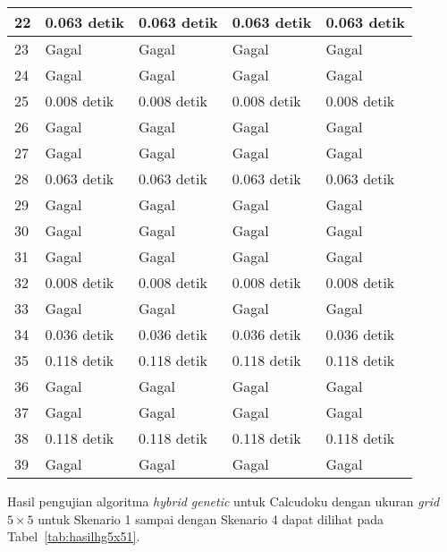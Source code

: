 \begin{table}
\begin{tabular}{| l | l | l | l | l |}
\hline
22 & 0.063 detik & 0.063 detik & 0.063 detik & 0.063 detik \\
\hline
23 & Gagal & Gagal & Gagal & Gagal \\
\hline
24 & Gagal & Gagal & Gagal & Gagal \\
\hline
25 & 0.008 detik & 0.008 detik & 0.008 detik & 0.008 detik \\
\hline
26 & Gagal & Gagal & Gagal & Gagal \\
\hline
27 & Gagal & Gagal & Gagal & Gagal \\
\hline
28 & 0.063 detik & 0.063 detik & 0.063 detik & 0.063 detik \\
\hline
29 & Gagal & Gagal & Gagal & Gagal \\
\hline
30 & Gagal & Gagal & Gagal & Gagal \\
\hline
31 & Gagal & Gagal & Gagal & Gagal \\
\hline
32 & 0.008 detik & 0.008 detik & 0.008 detik & 0.008 detik \\
\hline
33 & Gagal & Gagal & Gagal & Gagal \\
\hline
34 & 0.036 detik & 0.036 detik & 0.036 detik & 0.036 detik \\
\hline
35 & 0.118 detik & 0.118 detik & 0.118 detik & 0.118 detik \\
\hline
36 & Gagal & Gagal & Gagal & Gagal \\
\hline
37 & Gagal & Gagal & Gagal & Gagal \\
\hline
38 & 0.118 detik & 0.118 detik & 0.118 detik & 0.118 detik \\
\hline
39 & Gagal & Gagal & Gagal & Gagal \\
\hline
\end{tabular}
\label{tab:hasilhg4x44}
\end{table}

Hasil pengujian algoritma \textit{hybrid genetic} untuk Calcudoku dengan ukuran \textit{grid} \begin{math}5 \times 5\end{math} untuk Skenario 1 sampai dengan Skenario 4 dapat dilihat pada Tabel~\ref{tab:hasilhg5x51}.


